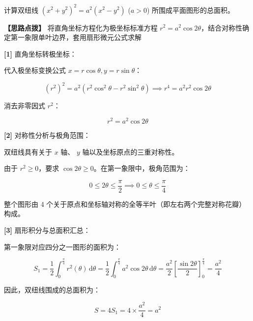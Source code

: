 \documentclass[11pt,a4paper,UTF8]{ctexart}
\begin{document}
计算双纽线 $(x^2+y^2)^2 = a^2(x^2-y^2)$ ($a > 0$) 所围成平面图形的总面积。

\textbf{\color{DeepPurple}【思路点拨】} 将直角坐标方程化为极坐标标准方程 $r^2 = a^2\cos 2\theta$，结合对称性确定第一象限单叶边界，套用扇形微元公式求解


\begin{solbox}[分步推导与答题规范]
\textbf{[1]} 直角坐标转极坐标：

代入极坐标变换公式 $x = r\cos\theta, y = r\sin\theta$：


\begin{equation*}
(r^2)^2 = a^2(r^2\cos^2\theta - r^2\sin^2\theta) \implies r^4 = a^2 r^2 \cos 2\theta
\end{equation*}


消去非零因式 $r^2$：


\begin{equation*}
r^2 = a^2\cos 2\theta
\end{equation*}


\textbf{[2]} 对称性分析与极角范围：

双纽线具有关于 $x$ 轴、 $y$ 轴以及坐标原点的三重对称性。

由于 $r^2 \geqslant 0$，要求 $\cos 2\theta \geqslant 0$。在第一象限中，极角范围为：


\begin{equation*}
0 \leqslant 2\theta \leqslant \frac{\pi}{2} \implies 0 \leqslant \theta \leqslant \frac{\pi}{4}
\end{equation*}


整个图形由 4 个关于原点和坐标轴对称的全等半叶（即左右两个完整对称花瓣）构成。

\textbf{[3]} 扇形积分与总面积汇总：

第一象限对应四分之一图形的面积为：


\begin{equation*}
S_1 = \frac{1}{2}\int_0^{\frac{\pi}{4}} r^2(\theta)\,\mathrm{d}\theta = \frac{1}{2}\int_0^{\frac{\pi}{4}} a^2\cos 2\theta\,\mathrm{d}\theta = \frac{a^2}{2} \left[\frac{\sin 2\theta}{2}\right]_0^{\frac{\pi}{4}} = \frac{a^2}{4}
\end{equation*}


因此，双纽线围成的总面积为：


\begin{equation*}
S = 4 S_1 = 4 \times \frac{a^2}{4} = a^2
\end{equation*}

\end{solbox}
\end{document}

